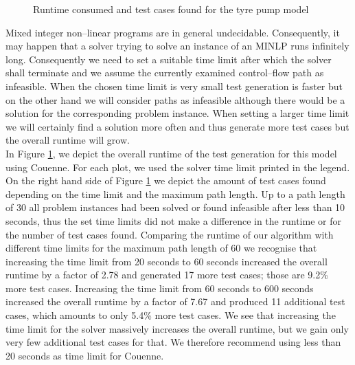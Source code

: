 \documentclass[runningheads,a4paper]{llncs}%
\begin{document}
\begin{figure}
%
\caption{Runtime consumed and test cases found for the tyre pump model%
}%
\label{fig:ExplodingTyresRuntime}%
\end{figure}%
Mixed integer non--linear programs are in general undecidable. Consequently, it may happen that a solver trying to solve an instance of an MINLP runs infinitely long. Consequently we need to set a suitable time limit after which the solver shall terminate and we assume the currently examined control--flow path as infeasible. When the chosen time limit is very small test generation is faster but on the other hand we will consider %
paths as infeasible although there would be a solution for the corresponding problem instance. When setting a larger time limit we will certainly find a solution more often and thus generate more test cases but the overall runtime will grow.\\
In Figure \ref{fig:ExplodingTyresRuntime}, we depict the overall runtime of the test generation for this model using Couenne. For each plot, we used the solver time limit printed in the legend. On the right hand side of Figure \ref{fig:ExplodingTyresRuntime} we depict the amount of test cases found depending on the time limit and the maximum path length. Up to a path length of 30 all problem instances had been solved or found infeasible after less than 10 seconds, thus the set time limits did not make a difference in the runtime or for the number of test cases found. Comparing the runtime of our algorithm with different time limits for the maximum path length of 60 we recognise that increasing the time limit from 20 seconds to 60 seconds increased the overall runtime by a factor of 2.78 and generated 17 more test cases; those are 9.2\% more test cases. Increasing the time limit from 60 seconds to 600 seconds increased the overall runtime by a factor of 7.67 and produced 11 additional test cases, which amounts to only 5.4\% more test cases. We see that increasing the time limit for the solver massively increases the overall runtime, but we gain only very few additional %
test cases for that. We therefore recommend using less than 20 seconds as time limit for Couenne.
\end{document}
